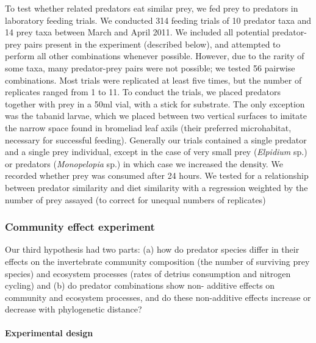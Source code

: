 To test whether related predators eat similar prey, we fed prey to
predators in laboratory feeding trials. We conducted 314 feeding trials
of 10 predator taxa and 14 prey taxa between March and April 2011. We
included all potential predator-prey pairs present in the experiment
(described below), and attempted to perform all other combinations
whenever possible. However, due to the rarity of some taxa, many
predator-prey pairs were not possible; we tested 56 pairwise
combinations. Most trials were replicated at least five times, but the
number of replicates ranged from 1 to 11. To conduct the trials, we
placed predators together with prey in a 50ml vial, with a stick for
substrate. The only exception was the tabanid larvae, which we placed
between two vertical surfaces to imitate the narrow space found in
bromeliad leaf axils (their preferred microhabitat, necessary for
successful feeding). Generally our trials contained a single predator
and a single prey individual, except in the case of very small prey
(\emph{Elpidium} sp.) or predators (\emph{Monopelopia} sp.) in which
case we increased the density. We recorded whether prey was consumed
after 24 hours. We tested for a relationship between predator similarity and diet similarity with a regression weighted by the number of prey assayed (to correct for unequal numbers of replicates)

\subsubsection{Community effect
experiment}\label{community-effect-experiment}

Our third hypothesis had two parts: (a) how do predator species differ
in their effects on the invertebrate community composition (the number of surviving prey species) and ecosystem processes (rates of detrius consumption and nitrogen cycling)
and (b) do predator combinations show non- additive effects on community
and ecosystem processes, and do these non-additive effects increase or
decrease with phylogenetic distance?

\paragraph{Experimental design}\label{experimental-design}

